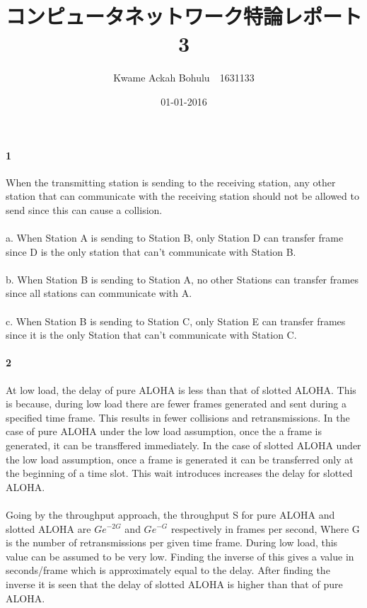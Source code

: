 \documentclass[24 pts]{article}
\title{コンピュータネットワーク特論レポート3	 }
\date{01-01-2016}
\author{Kwame Ackah Bohulu　1631133}
\begin{document}
\maketitle
\newpage
\paragraph{1}
When the transmitting station is sending to the receiving station, any other station that can communicate with the receiving station should not be allowed to send since this can cause a collision.\paragraph{}
a. When Station A is sending to Station B, only Station D can transfer frame since D is the only station that can't communicate with Station B.\paragraph{}
b. When Station B is sending to Station A, no other Stations can transfer frames since all stations can communicate with A.\paragraph{}
c. When Station B is sending to Station C, only Station E can transfer frames since it is the only Station that can't communicate with Station C.


\newpage
\paragraph{2}
At low load, the delay of pure ALOHA is less than that of slotted ALOHA. This is because, during low load there are fewer frames generated and sent during a specified time frame. This results in fewer collisions and retransmissions. In the case of pure ALOHA under the low load assumption, once the a frame is generated, it can be transffered immediately. In the case of slotted ALOHA under the low load assumption, once a frame is generated it can be transferred only at the beginning of a time slot. This wait introduces increases the delay for slotted ALOHA. \paragraph{}Going by the throughput approach, the throughput S for pure ALOHA and slotted ALOHA are $Ge^{-2G}$ and $Ge^{-G}$ respectively in frames per second, Where G is the number of retransmissions per given time frame. During low load, this value can be assumed to be very low. Finding the inverse of this gives a value in seconds/frame which is approximately equal to the delay. After finding the inverse it is seen that the delay of slotted ALOHA is higher than that of pure ALOHA.
\newpage
\end{document}
